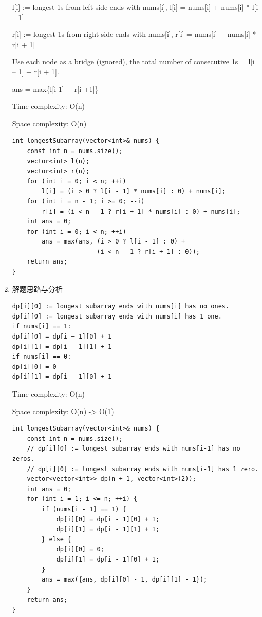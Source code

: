 \documentclass[9pt, b5paaper]{book}
\begin{document}
\begin{enumerate}
l[i] := longest 1s from left side ends with nums[i], l[i] = nums[i] + nums[i] * l[i – 1]

r[i] := longest 1s from right side ends with nums[i], r[i] = nums[i] + nums[i] * r[i + 1]

Use each node as a bridge (ignored), the total number of consecutive 1s = l[i – 1] + r[i + 1].

ans = max\{l[i-1] + r[i +1]\}

Time complexity: O(n)

Space complexity: O(n)
\begin{verbatim}
int longestSubarray(vector<int>& nums) {
    const int n = nums.size();
    vector<int> l(n);
    vector<int> r(n);
    for (int i = 0; i < n; ++i)
        l[i] = (i > 0 ? l[i - 1] * nums[i] : 0) + nums[i];
    for (int i = n - 1; i >= 0; --i)
        r[i] = (i < n - 1 ? r[i + 1] * nums[i] : 0) + nums[i];
    int ans = 0;
    for (int i = 0; i < n; ++i)
        ans = max(ans, (i > 0 ? l[i - 1] : 0) + 
                       (i < n - 1 ? r[i + 1] : 0));
    return ans;
}
\end{verbatim}
\item 解题思路与分析
\label{sec-5-0-17-4}
\begin{verbatim}
dp[i][0] := longest subarray ends with nums[i] has no ones.
dp[i][0] := longest subarray ends with nums[i] has 1 one.
if nums[i] == 1:
dp[i][0] = dp[i – 1][0] + 1
dp[i][1] = dp[i – 1][1] + 1
if nums[i] == 0:
dp[i][0] = 0
dp[i][1] = dp[i – 1][0] + 1
\end{verbatim}

Time complexity: O(n)

Space complexity: O(n) -> O(1)

\begin{verbatim}
int longestSubarray(vector<int>& nums) {
    const int n = nums.size();
    // dp[i][0] := longest subarray ends with nums[i-1] has no zeros.
    // dp[i][0] := longest subarray ends with nums[i-1] has 1 zero.
    vector<vector<int>> dp(n + 1, vector<int>(2));
    int ans = 0;
    for (int i = 1; i <= n; ++i) {
        if (nums[i - 1] == 1) {
            dp[i][0] = dp[i - 1][0] + 1;
            dp[i][1] = dp[i - 1][1] + 1;
        } else {
            dp[i][0] = 0;
            dp[i][1] = dp[i - 1][0] + 1;
        }
        ans = max({ans, dp[i][0] - 1, dp[i][1] - 1});
    }
    return ans;
}
\end{verbatim}
\end{enumerate}
\end{document}
